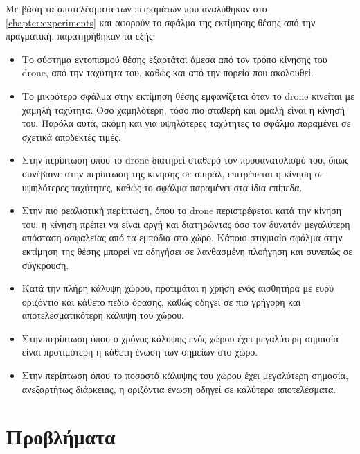 Με βάση τα αποτελέσματα των πειραμάτων που αναλύθηκαν στο \autoref{chapter:experiments} και αφορούν το σφάλμα της εκτίμησης θέσης από την πραγματική, παρατηρήθηκαν τα εξής:
\begin{itemize}
    \item {Το σύστημα εντοπισμού θέσης εξαρτάται άμεσα από τον τρόπο κίνησης του drone, από την ταχύτητα του, καθώς και από την πορεία που ακολουθεί.}
    \item{Το μικρότερο σφάλμα στην εκτίμηση θέσης εμφανίζεται όταν το drone κινείται με χαμηλή ταχύτητα. Όσο χαμηλότερη, τόσο πιο σταθερή και ομαλή είναι η κίνησή του. Παρόλα αυτά, ακόμη και για υψηλότερες ταχύτητες το σφάλμα παραμένει σε σχετικά αποδεκτές τιμές.}
    \item{Στην περίπτωση όπου το drone διατηρεί σταθερό τον προσανατολισμό του, όπως συνέβαινε στην περίπτωση της κίνησης σε σπιράλ, επιτρέπεται η κίνηση σε υψηλότερες ταχύτητες, καθώς το σφάλμα παραμένει στα ίδια επίπεδα.}
    \item{Στην πιο ρεαλιστική περίπτωση, όπου το drone περιστρέφεται κατά την κίνηση του, η κίνηση πρέπει να είναι αργή και διατηρώντας όσο τον δυνατόν μεγαλύτερη απόσταση ασφαλείας από τα εμπόδια στο χώρο. Κάποιο στιγμιαίο σφάλμα στην εκτίμηση της θέσης μπορεί να οδηγήσει σε λανθασμένη πλοήγηση και συνεπώς σε σύγκρουση.}
    \item{Κατά την πλήρη κάλυψη χώρου, προτιμάται η χρήση ενός αισθητήρα με ευρύ οριζόντιο και κάθετο πεδίο όρασης, καθώς οδηγεί σε πιο γρήγορη και αποτελεσματικότερη κάλυψη του χώρου.}
    \item{Στην περίπτωση όπου ο χρόνος κάλυψης ενός χώρου έχει μεγαλύτερη σημασία είναι προτιμότερη η κάθετη ένωση των σημείων στο χώρο.}
    \item{Στην περίπτωση όπου το ποσοστό κάλυψης του χώρου έχει μεγαλύτερη σημασία, ανεξαρτήτως διάρκειας, η οριζόντια ένωση οδηγεί σε καλύτερα αποτελέσματα.}
\end{itemize}





\section{Προβλήματα}

